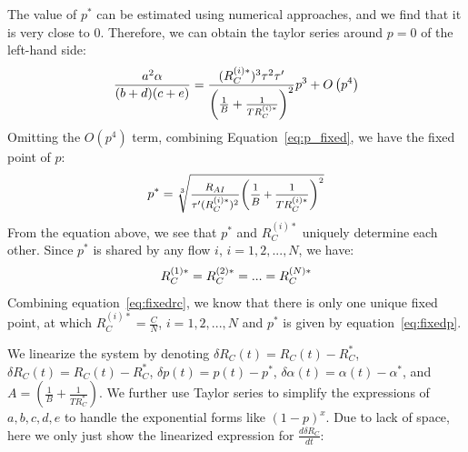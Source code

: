 The value of $p^*$ can be estimated using numerical approaches, and we find that
it is very close to 0. Therefore, we can obtain the taylor series around $p=0$
of the left-hand side:
\begin{equation}
\small
\frac{{{a^2}\alpha }}{{(b + d)(c + e)}} = \frac{{(R_C^{(i)*})^3{\tau ^2}\tau '}}{{{{\left( {\frac{1}{B} + \frac{1}{{TR_C^{(i)*}}}} \right)}^2}}}{p^3} + O\left( {{p^4}} \right)
\end{equation}
Omitting the $O(p^4)$ term, combining Equation~\ref{eq:p_fixed}, we have the fixed point of $p$:
\begin{equation}
\small
{p^*} = \sqrt[3]{{\frac{{{R_{AI}}}}{{{\tau '}(R_C^{(i)*})^2}}{{\left( {\frac{1}{B} + \frac{1}{TR_C^{(i)*}}} \right)}^2}}}
\label{eq:fixedp}
\end{equation}
From the equation above, we see that $p^*$ and $R_C^{(i)*}$ uniquely determine each other. 
Since $p^*$ is shared by any flow $i$, $i = 1, 2, ..., N$, we have:
\begin{equation}
\small
R_C^{(1)*} = R_C^{(2)*} = ... = R_C^{(N)*}
\end{equation}
Combining equation~\ref{eq:fixedrc}, we know that there is only one unique fixed
point, at which $R_C^{(i)*} = \frac{C}{N}$, $i = 1, 2, ..., N$ and $p^*$ is
given by equation~\ref{eq:fixedp}.

We linearize the system by denoting $\delta {R_C}(t) = {R_C}(t) - R_C^*$,
$\delta {R_C}(t) = {R_C}(t) - R_C^*$, $\delta p(t) = p(t) - p^*$, $\delta \alpha
(t) = \alpha (t) - \alpha^*$, and $A = \left( {\frac{1}{B} + \frac{1}{{TR_C^*}}}
\right)$.  We further use Taylor series to simplify the expressions of $a, b, c,
d, e$ to handle the exponential forms like $(1-p)^x$.  Due to lack of space,
here we only just show the linearized expression for $\frac{{d\delta {R_C}}}{{dt}}$:

